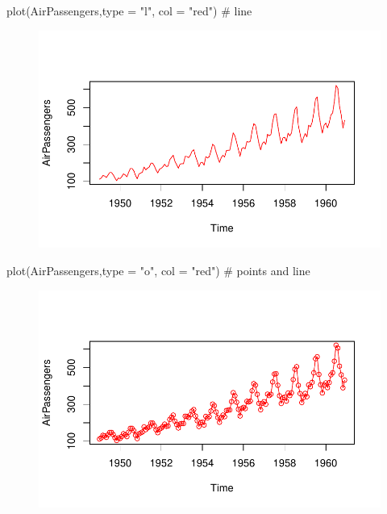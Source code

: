 \documentclass[
  letterpaper,
  DIV=11,
  numbers=noendperiod]{scrreprt}
\newenvironment{Shaded}{\begin{snugshade}}{\end{snugshade}}
\newcommand{\AttributeTok}[1]{\textcolor[rgb]{0.40,0.45,0.13}{#1}}
\newcommand{\CommentTok}[1]{\textcolor[rgb]{0.37,0.37,0.37}{#1}}
\newcommand{\FunctionTok}[1]{\textcolor[rgb]{0.28,0.35,0.67}{#1}}
\newcommand{\NormalTok}[1]{\textcolor[rgb]{0.00,0.23,0.31}{#1}}
\newcommand{\StringTok}[1]{\textcolor[rgb]{0.13,0.47,0.30}{#1}}
\begin{document}
\begin{Shaded}
\begin{Highlighting}[]
\FunctionTok{plot}\NormalTok{(AirPassengers,}\AttributeTok{type =} \StringTok{"l"}\NormalTok{, }\AttributeTok{col =} \StringTok{"red"}\NormalTok{) }\CommentTok{\# line}
\end{Highlighting}
\end{Shaded}

\begin{figure}[H]

{\centering \includegraphics{data_analysis_files/figure-pdf/unnamed-chunk-5-2.pdf}

}

\end{figure}

\begin{Shaded}
\begin{Highlighting}[]
\FunctionTok{plot}\NormalTok{(AirPassengers,}\AttributeTok{type =} \StringTok{"o"}\NormalTok{, }\AttributeTok{col =} \StringTok{"red"}\NormalTok{) }\CommentTok{\# points and line}
\end{Highlighting}
\end{Shaded}

\begin{figure}[H]

{\centering \includegraphics{data_analysis_files/figure-pdf/unnamed-chunk-5-3.pdf}

}

\end{figure}
\end{document}
